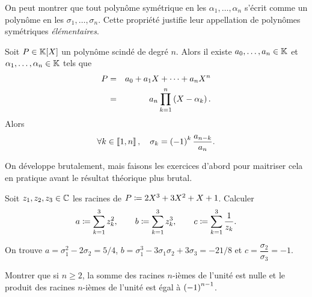 \documentclass{magnolia}
\begin{document}
\begin{remarqueUnique}
\remarque On peut montrer que tout
  polynôme symétrique en les $\alpha_1,\ldots,\alpha_n$ s'écrit comme un polynôme
  en les $\sigma_1,\ldots,\sigma_n$. Cette propriété justifie leur appellation
  de polynômes symétriques \textit{élémentaires}. 
\end{remarqueUnique}

\begin{proposition}[nom={Relations coefficients-racines, formules de \nom{Viète}}]
Soit $P\in\polyK$ un polynôme scindé de degré $n$. Alors il
existe $a_0,\ldots,a_n\in\mathbb{K}$ et $\alpha_1,\ldots,\alpha_n\in\mathbb{K}$
tels que
\begin{eqnarray*}
P &=& a_0+a_1 X+\cdots+a_n X^n\\
  &=& a_n \prod_{k=1}^n \left(X-\alpha_k\right).
\end{eqnarray*}
Alors
\[\forall k\in\left\llbracket 1,n\right\rrbracket ,\quad \sigma_k=\left(-1\right)^k\frac{a_{n-k}}{a_n}.\]
\end{proposition}

\begin{preuve}
On développe brutalement, mais faisons les exercices d'abord pour maitriser cela en pratique avant le résultat théorique plus brutal.
\end{preuve}

\begin{exos}
\exo Soit $z_1,z_2,z_3\in\mathbb{C}$ les racines de $P\coloneqq 2X^3+3X^2+X+1$. Calculer
  \[a\coloneqq\sum_{k=1}^3 z_k^2, \qquad b\coloneqq\sum_{k=1}^3 z_k^3, \qquad
    c\coloneqq\sum_{k=1}^3 \frac{1}{z_k}.\]
  \begin{sol}
  On trouve $a=\sigma_1^2-2\sigma_2=5/4$, $b=\sigma_1^3-3\sigma_1\sigma_2+3\sigma_3=-21/8$ et $c=\dfrac{\sigma_2}{\sigma_3}=-1$.      
  \end{sol}
\exo Montrer que si $n\geq 2$, la somme des racines $n$-ièmes
  de l'unité est nulle et le produit des racines $n$-ièmes de l'unité
  est égal à $\left(-1\right)^{n-1}$.
\end{exos}
\end{document}
